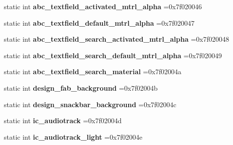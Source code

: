 \begin{DoxyCompactItemize}
static int {\bfseries abc\+\_\+textfield\+\_\+activated\+\_\+mtrl\+\_\+alpha} =0x7f020046
\item 
\mbox{\label{classandroid_1_1support_1_1v4_1_1R_1_1drawable_adb6ed9764d800d51a87bdaa94f15d13b}} 
static int {\bfseries abc\+\_\+textfield\+\_\+default\+\_\+mtrl\+\_\+alpha} =0x7f020047
\item 
\mbox{\label{classandroid_1_1support_1_1v4_1_1R_1_1drawable_a6ca0c4d0979c221b44ff2d5a1e29bb57}} 
static int {\bfseries abc\+\_\+textfield\+\_\+search\+\_\+activated\+\_\+mtrl\+\_\+alpha} =0x7f020048
\item 
\mbox{\label{classandroid_1_1support_1_1v4_1_1R_1_1drawable_ae1222a86d30e4c7d5c8a9281b737f0b2}} 
static int {\bfseries abc\+\_\+textfield\+\_\+search\+\_\+default\+\_\+mtrl\+\_\+alpha} =0x7f020049
\item 
\mbox{\label{classandroid_1_1support_1_1v4_1_1R_1_1drawable_adfa1401743bd1780d006e62c3d09cff9}} 
static int {\bfseries abc\+\_\+textfield\+\_\+search\+\_\+material} =0x7f02004a
\item 
\mbox{\label{classandroid_1_1support_1_1v4_1_1R_1_1drawable_a9a0bd1ec53d594d66b6eb9b07f97d458}} 
static int {\bfseries design\+\_\+fab\+\_\+background} =0x7f02004b
\item 
\mbox{\label{classandroid_1_1support_1_1v4_1_1R_1_1drawable_afe8f4c972d19c2c093a77d8acbe4d40b}} 
static int {\bfseries design\+\_\+snackbar\+\_\+background} =0x7f02004c
\item 
\mbox{\label{classandroid_1_1support_1_1v4_1_1R_1_1drawable_a8a6a35d6b61eec286702aab77525f8f6}} 
static int {\bfseries ic\+\_\+audiotrack} =0x7f02004d
\item 
\mbox{\label{classandroid_1_1support_1_1v4_1_1R_1_1drawable_a4f046ce3318f949a35be9198caa2c215}} 
static int {\bfseries ic\+\_\+audiotrack\+\_\+light} =0x7f02004e

\end{DoxyCompactItemize}
